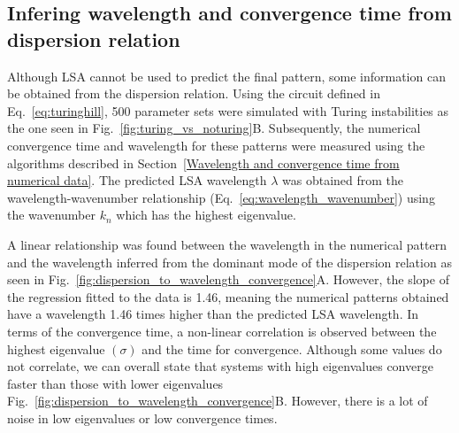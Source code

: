 \subsection{Infering wavelength and convergence time from dispersion relation}
Although LSA cannot be used to predict the final pattern, some information can be obtained from the dispersion relation.
Using the circuit defined in Eq.~\ref{eq:turinghill}, 500 parameter sets were simulated with Turing instabilities as the one seen in Fig.~\ref{fig:turing_vs_noturing}B. Subsequently, the numerical convergence time and wavelength for these patterns were measured using the algorithms described in Section~\ref{Wavelength and convergence time from numerical data}.
The predicted LSA wavelength $\lambda$ was obtained from the wavelength-wavenumber relationship (Eq.~\ref{eq:wavelength_wavenumber}) using the wavenumber $k_{n}$ which has the highest eigenvalue.

A linear relationship was found between the wavelength in the numerical pattern and the wavelength inferred from the dominant mode of the dispersion relation as seen in Fig.~\ref{fig:dispersion_to_wavelength_convergence}A. However, the slope of the regression fitted to the data is 1.46, meaning the numerical patterns obtained have a wavelength 1.46 times higher than the predicted LSA wavelength.
In terms of the convergence time, a non-linear correlation is observed between the highest eigenvalue $(\sigma)$ and the time for convergence.
Although some values do not correlate, we can overall state that systems with high eigenvalues converge faster than those with lower eigenvalues Fig.~\ref{fig:dispersion_to_wavelength_convergence}B.
However, there is a lot of noise in low eigenvalues or low convergence times.

